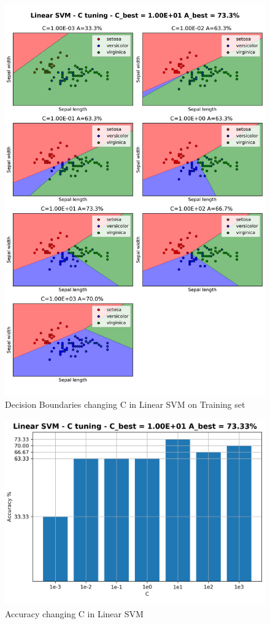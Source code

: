 \documentclass[a4paper, 11pt]{article}
\begin{document}
	
	\begin{figure}[ht!]
		\centering
		\includegraphics[height=0.8\paperheight]{img/fig01a.png}
		\caption{Decision Boundaries changing C in Linear SVM on Training set}
		\label{fig:linear1}
	\end{figure}

	\begin{figure}[ht!]
		\centering
		\includegraphics[width=0.7\paperwidth]{img/fig01b.png}
		\caption{Accuracy changing C in Linear SVM}
		\label{fig:linear2}
	\end{figure}
\end{document}
